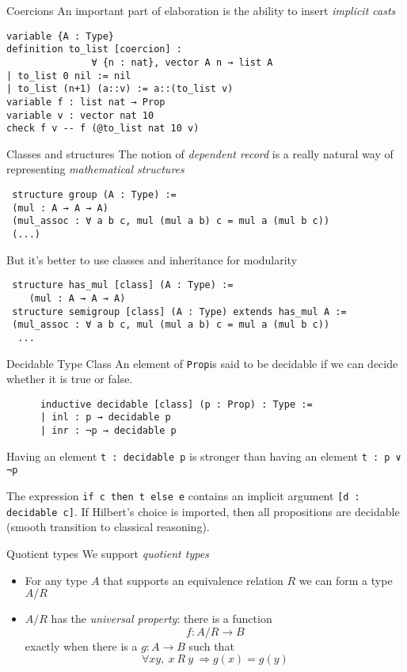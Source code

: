 \documentclass{beamer}
\newcommand{\ttt}[1]{\texttt{#1}}
\newcommand{\Prop}{\ttt{Prop}}
\begin{document}
\begin{frame}[fragile]{Coercions}
  An important part of elaboration is the ability to insert
  \emph{implicit casts}
\small{
  \begin{lstlisting}
variable {A : Type}
definition to_list [coercion] :
               ∀ {n : nat}, vector A n → list A
| to_list 0 nil := nil
| to_list (n+1) (a::v) := a::(to_list v)
variable f : list nat → Prop
variable v : vector nat 10
check f v -- f (@to_list nat 10 v)
  \end{lstlisting}
}
\end{frame}

\begin{frame}[fragile]{Classes and structures}
  The notion of \emph{dependent record} is a really natural way of
  representing \emph{mathematical structures}
\small{
  \begin{lstlisting}
 structure group (A : Type) :=
 (mul : A → A → A)
 (mul_assoc : ∀ a b c, mul (mul a b) c = mul a (mul b c))
 (...)
  \end{lstlisting}}
But it's better to use classes and inheritance for modularity
\small{
  \begin{lstlisting}
 structure has_mul [class] (A : Type) :=
    (mul : A → A → A)
 structure semigroup [class] (A : Type) extends has_mul A :=
 (mul_assoc : ∀ a b c, mul (mul a b) c = mul a (mul b c))
  ...
  \end{lstlisting}}

\end{frame}

\begin{frame}[fragile]{Decidable Type Class}
    An element of \Prop is said to be decidable if we can decide
    whether it is true or false.

    \begin{lstlisting}
      inductive decidable [class] (p : Prop) : Type :=
      | inl : p → decidable p
      | inr : ¬p → decidable p
    \end{lstlisting}

    Having an element \ttt{t : decidable p} is stronger than having an element \ttt{t : p ∨ ¬p}
    
    The expression \ttt{if c then t else e} contains an implicit argument \ttt{[d : decidable c]}.
    If Hilbert's choice is imported, then all propositions are decidable (smooth transition to classical reasoning).
\end{frame}

\begin{frame}[fragile]{Quotient types}
  We support \emph{quotient types}
  \begin{itemize}
  \item For any type $A$ that supports an equivalence relation $R$ we
    can form a type $A/R$
  \item $A/R$ has the \emph{universal property}: there is a function
    \[f:A/R \rightarrow B\]
    exactly when there is a $g:A\rightarrow B$ such that
    \[\forall x y,\ x\ R\ y\ \Rightarrow g(x) = g(y)\]
  \end{itemize}
\end{frame}
\end{document}
